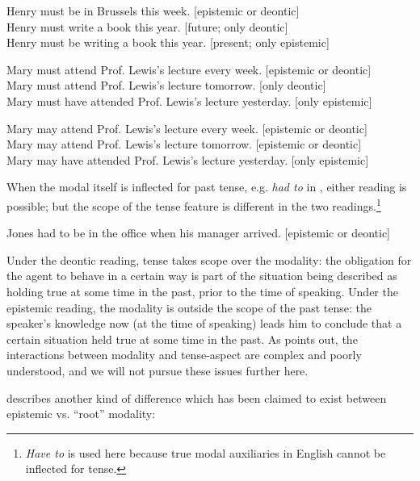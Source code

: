 \ea \label{ex:16.29}
\ea  Henry must be in Brussels this week.  \hfill [epistemic or deontic]\\
\ex Henry must write a book this year.                   \hfill [future; only deontic]\\
\ex Henry must be writing a book this year.              \hfill [present; only epistemic]
                       \z
\z

\ea \label{ex:16.30}
\ea  Mary must attend Prof. Lewis’s lecture every week. \hfill [epistemic or deontic]\\
\ex Mary must attend Prof. Lewis’s lecture tomorrow.                  \hfill [only deontic]\\
\ex Mary must have attended Prof. Lewis’s lecture yesterday.          \hfill [only epistemic]
                       \z
\z

\ea \label{ex:16.31}
\ea  Mary may attend Prof. Lewis’s lecture every week. \hfill [epistemic or deontic]\\
\ex Mary may attend Prof. Lewis’s lecture tomorrow.                  \hfill [epistemic or deontic]\\
\ex Mary may have attended Prof. Lewis’s lecture yesterday.          \hfill [only epistemic]
                       \z
\z


When the modal itself is inflected for past tense, e.g. \textit{had to} in , either reading is possible; but the scope of the tense feature is different in the two readings.\footnote{\textit{Have to} is used here because true modal auxiliaries in English cannot be inflected for tense.}


\ea \label{ex:16.32}
Jones had to be in the office when his manager arrived. \hfill [epistemic or deontic]
\z


Under the deontic reading, tense takes scope over the modality: the obligation for the agent to behave in a certain way is part of the situation being described as holding true at some time in the past, prior to the time of speaking. Under the epistemic reading, the modality is outside the scope of the past tense: the speaker’s knowledge now (at the time of speaking) leads him to conclude that a certain situation held true at some time in the past. As \citet{vonFintel2006} points out, the interactions between modality and tense-aspect are complex and poorly understood, and we will not pursue these issues further here.



\citet[1688]{Papafragou2006} describes another kind of difference which has been claimed to exist between epistemic vs. “root” modality:


